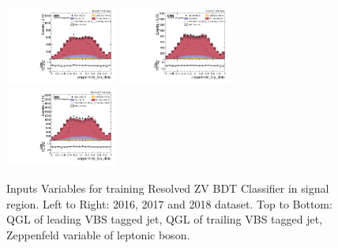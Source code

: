 \begin{figure}[!ht]
  \includegraphics[width=0.33\textwidth]{analysis_plots/2016_zjj/sr_l/zeppenfeld_lep_deta.pdf} \hspace{-10pt}
  \includegraphics[width=0.33\textwidth]{analysis_plots/2017_zjj/sr_l/zeppenfeld_lep_deta.pdf} \hspace{-10pt}
  \includegraphics[width=0.33\textwidth]{analysis_plots/2018_zjj/sr_l/zeppenfeld_lep_deta.pdf} \hspace{-10pt}
  \caption[Inputs Variables for training Resolved ZV BDT Classifier in signal region.]%
  {Inputs Variables for training Resolved ZV BDT Classifier in signal region.
    Left to Right: 2016, 2017 and 2018 dataset.
    Top to Bottom: QGL of leading VBS tagged jet,
    QGL of trailing VBS tagged jet, Zeppenfeld variable of leptonic boson.}%
  \label{fig:vbs-training-input-zjj-1-sr}
\end{figure}



